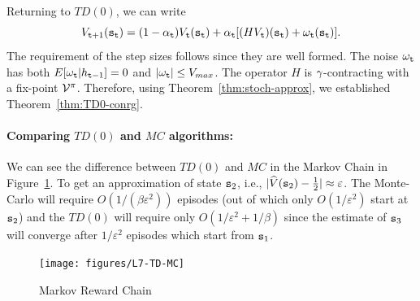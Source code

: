 Returning to $TD(0)$, we can write
\[
V_{{\tt t}+1}({\tt s}_{\tt t})=(1-\alpha_{\tt t})V_{\tt t}({\tt s}_{\tt t})+\alpha_{\tt t}
[(HV_{\tt t})({\tt s}_{\tt t})+\omega_{\tt t}({\tt s}_{\tt t})].
\]
The requirement of the step sizes follows since they are well formed. The noise $\omega_{\tt t}$ has both
$E[\omega_{\tt t}|h_{{\tt t}-1}]=0$ and $|\omega_{\tt t}|\leq V_{max}$. The
operator $H$ is $\gamma$-contracting with a fix-point $\mathcal{V}^\pi$.
Therefore, using Theorem~\ref{thm:stoch-approx}, we established
Theorem~\ref{thm:TD0-conrg}.

\paragraph{Comparing $TD(0)$ and $MC$ algorithms:}
%
We can see the difference between $TD(0)$ and $MC$ in the Markov
Chain in Figure~\ref{fig:L7-TD-MC}. To get an approximation of state
${\tt s}_2$, i.e., $|\widehat{V}({\tt s}_2)-\frac{1}{2}|\approx
\varepsilon$. The Monte-Carlo will require $O(1/(\beta
\varepsilon^2))$ episodes (out of which only $O(1/\varepsilon^2)$
start at ${\tt s}_2$) and the $TD(0)$ will require only
$O(1/\varepsilon^2+1/\beta)$ since the estimate of ${\tt s}_3$ will
converge after $1/\varepsilon^2$ episodes which start from
${\tt s}_1$.

\begin{figure}
  \begin{centering}
  \texttt{[image: figures/L7-TD-MC]}\\
  \caption{Markov Reward Chain}\label{fig:L7-TD-MC}
  \end{centering}
\end{figure}

